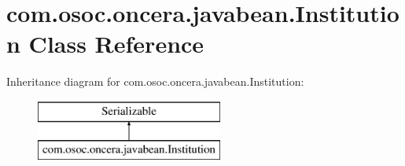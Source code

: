 \hypertarget{classcom_1_1osoc_1_1oncera_1_1javabean_1_1_institution}{}\section{com.\+osoc.\+oncera.\+javabean.\+Institution Class Reference}
\label{classcom_1_1osoc_1_1oncera_1_1javabean_1_1_institution}
Inheritance diagram for com.\+osoc.\+oncera.\+javabean.\+Institution\+:\begin{figure}[H]
\begin{center}
\leavevmode
\includegraphics[height=2.000000cm]{classcom_1_1osoc_1_1oncera_1_1javabean_1_1_institution}
\end{center}
\end{figure}
